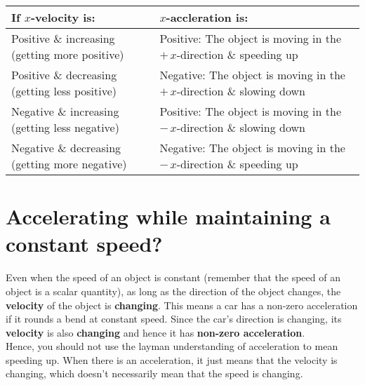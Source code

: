 \documentclass[11pt]{article}
\begin{document}
\begin{center}
\begin{tabular}{ |m{11em}|m{11em}| }
\hline
If $x$-velocity is: & $x$-accleration is: \\
\hline
Positive \& increasing (getting more positive) & Positive: The object is moving in the $+ \, x$-direction \& speeding up \\
\hline
Positive \& decreasing (getting less positive) & Negative: The object is moving in the $+ \, x$-direction \& slowing down \\
\hline
Negative \& increasing (getting less negative) & Positive: The object is moving in the $- \, x$-direction \& slowing down \\
\hline
Negative \& decreasing (getting more negative) & Negative: The object is moving in the $- \, x$-direction \& speeding up \\
\hline
\end{tabular}
\end{center}


\section{Accelerating while maintaining a constant speed?}
\label{sec:orgf953b46}
Even when the speed of an object is constant (remember that the speed of an object is a scalar quantity), as long as the direction of the object changes, the \textbf{velocity} of the object is \textbf{changing}. This means a car has a non-zero acceleration if it rounds a bend at constant speed. Since the car's direction is changing, its \textbf{velocity} is also \textbf{changing} and hence it has \textbf{non-zero acceleration}.
\\[0pt]

Hence, you should not use the layman understanding of acceleration to mean speeding up. When there is an acceleration, it just means that the velocity is changing, which doesn't necessarily mean that the speed is changing.
\end{document}
